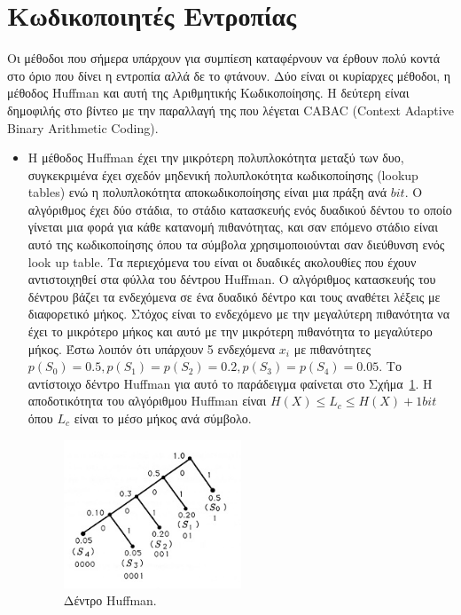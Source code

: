 \section{Κωδικοποιητές Εντροπίας}
\label{section:sect33}

\indent Οι μέθοδοι που σήμερα υπάρχουν για συμπίεση καταφέρνουν να έρθουν πολύ κοντά στο όριο που δίνει η εντροπία αλλά δε το φτάνουν. Δύο είναι οι κυρίαρχες μέθοδοι, η μέθοδος Huffman και αυτή της Αριθμητικής Κωδικοποίησης. Η δεύτερη είναι δημοφιλής στο βίντεο με την παραλλαγή της που λέγεται CABAC (Context Adaptive Binary Arithmetic Coding).
\begin{itemize}
  \item Η μέθοδος Huffman έχει την μικρότερη πολυπλοκότητα μεταξύ των δυο, συγκεκριμένα έχει σχεδόν μηδενική πολυπλοκότητα κωδικοποίησης (lookup tables) ενώ η πολυπλοκότητα αποκωδικοποίησης είναι μια πράξη ανά $bit$. Ο αλγόριθμος έχει δύο στάδια, το στάδιο κατασκευής ενός δυαδικού δέντου το οποίο γίνεται μια φορά για κάθε κατανομή πιθανότητας, και σαν επόμενο στάδιο είναι αυτό της κωδικοποίησης όπου τα σύμβολα χρησιμοποιούνται σαν διεύθυνση ενός look up table. Τα περιεχόμενα του είναι οι δυαδικές ακολουθίες που έχουν αντιστοιχηθεί στα φύλλα του δέντρου Huffman. Ο αλγόριθμος κατασκευής του δέντρου βάζει τα ενδεχόμενα σε ένα δυαδικό δέντρο και τους αναθέτει λέξεις με διαφορετικό μήκος. Στόχος είναι το ενδεχόμενο με την μεγαλύτερη πιθανότητα να έχει το μικρότερο μήκος και αυτό με την μικρότερη πιθανότητα το μεγαλύτερο μήκος. Έστω λοιπόν ότι υπάρχουν 5 ενδεχόμενα $x_i$ με πιθανότητες $p(S_0) = 0.5, p(S_1)=p(S_2)=0.2, p(S_3)=p(S_4)=0.05$. Το αντίστοιχο δέντρο Huffman για αυτό το παράδειγμα φαίνεται στο Σχήμα~\ref{fig:huffman}. Η αποδοτικότητα του αλγόριθμου Huffman είναι $ H(X) \leq L_c \leq H(X)+1bit  $ όπου $L_c$ είναι το μέσο μήκος ανά σύμβολο. 
      \begin{figure}[h!]
          \centering
          \includegraphics[width=0.5\textwidth]{chapter3/huffman.jpg}
          \caption{Δέντρο Huffman. \cite{misc:huffman}}
          \label{fig:huffman}
      \end{figure}


\end{itemize}
